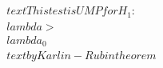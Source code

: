 \documentclass[preview]{standalone}
\begin{document}
\begin{align*}
\quad\\text{This test is UMP for } H_1: \quad\\lambda > \quad\\lambda_0 \quad\\text{ by Karlin-Rubin theorem}
\end{align*}
\end{document}
